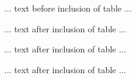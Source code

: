 \documentclass[10pt]{article}
\begin{document}
... text before inclusion of table ...

... text after inclusion of table  ...

... text after inclusion of table  ...

... text after inclusion of table  ...
\end{document}
